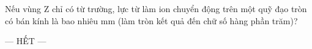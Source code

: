 	\begin{ex}%
		\label{HaNoi-SoGD-Lan1-III6}
		Nếu vùng Z chỉ có từ trường, lực từ làm ion chuyển động trên một quỹ đạo tròn có bán kính là bao nhiêu mm (làm tròn kết quả đến chữ số hàng phần trăm)?
		\par
	\end{ex}

	\centerline{--- HẾT ---}


